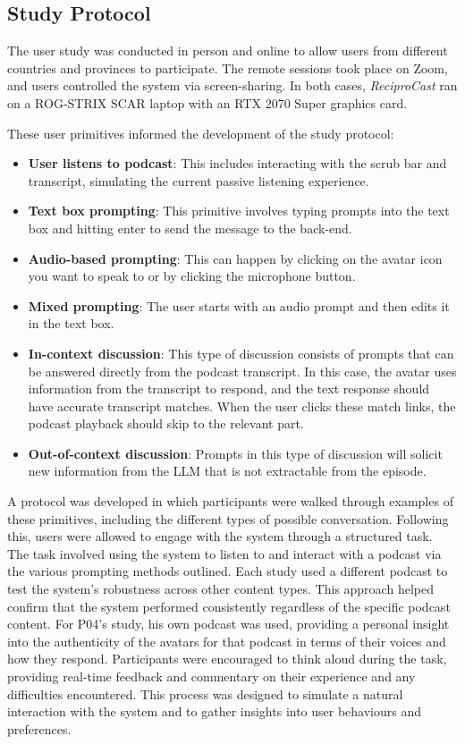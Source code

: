 \documentclass[12pt]{report}
\begin{document}
\begin{myfont}
        
        \section{Study Protocol}
        The user study was conducted in person and online to allow users from different countries and provinces to participate. The remote sessions took place on Zoom, and users controlled the system via screen-sharing. In both cases, \textit{ReciproCast} ran on a ROG-STRIX SCAR laptop with an RTX 2070 Super graphics card.
        
        These user primitives informed the development of the study protocol:

        \begin{itemize}
            \item \textbf{User listens to podcast}: This includes interacting with the scrub bar and transcript, simulating the current passive listening experience.
            \item \textbf{Text box prompting}: This primitive involves typing prompts into the text box and hitting enter to send the message to the back-end.
            \item \textbf{Audio-based prompting}: This can happen by clicking on the avatar icon you want to speak to or by clicking the microphone button.
            \item \textbf{Mixed prompting}: The user starts with an audio prompt and then edits it in the text box.
            \item \textbf{In-context discussion}: This type of discussion consists of prompts that can be answered directly from the podcast transcript. In this case, the avatar uses information from the transcript to respond, and the text response should have accurate transcript matches. When the user clicks these match links, the podcast playback should skip to the relevant part.
            \item \textbf{Out-of-context discussion}: Prompts in this type of discussion will solicit new information from the LLM that is not extractable from the episode.
        \end{itemize}

        A protocol was developed in which participants were walked through examples of these primitives, including the different types of possible conversation. Following this, users were allowed to engage with the system through a structured task. The task involved using the system to listen to and interact with a podcast via the various prompting methods outlined. Each study used a different podcast to test the system's robustness across other content types. This approach helped confirm that the system performed consistently regardless of the specific podcast content. For P04's study, his own podcast was used, providing a personal insight into the authenticity of the avatars for that podcast in terms of their voices and how they respond. Participants were encouraged to think aloud during the task, providing real-time feedback and commentary on their experience and any difficulties encountered. This process was designed to simulate a natural interaction with the system and to gather insights into user behaviours and preferences.
        

\end{myfont}
\end{document}
